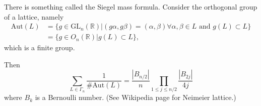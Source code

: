 \medskip\noindent
There is something called the Siegel mass formula.
Consider the orthogonal group of a lattice, namely
\begin{align*}
\text{Aut}(L)&=\{g \in \text{GL}_n(\mathbb{R})
|(g \alpha,g \beta)=(\alpha,\beta)\forall \alpha,\beta \in L\text{ and }
g(L) \subset L\}\\
&=\{g \in O_n(\mathbb{R})|g(L) \subset L\},
\end{align*}
which is a finite group.

Then
$$
\sum_{L \in \Gamma_n}\frac{1}{\# \text{Aut}(L)}
=\frac{|B_{n/2}|}{n}
\prod_{1 \leq j \leq  n/2}\frac{|B_{2j}|}{4j}
$$
where $B_k$ is a Bernoulli number.
(See Wikipedia page for Neimeier lattice.)





